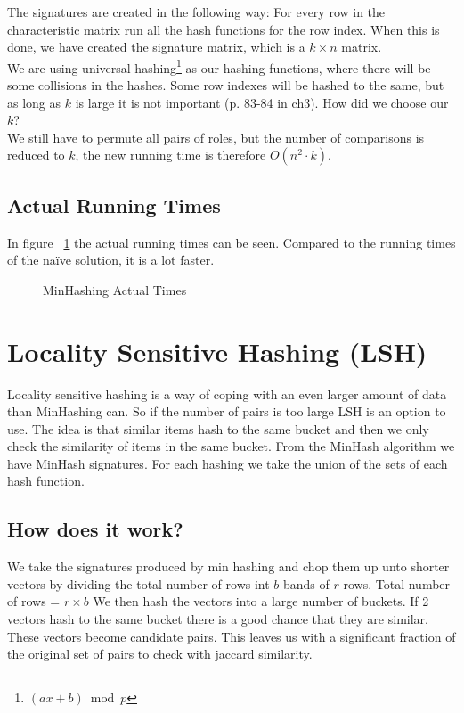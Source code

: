 \documentclass[a4paper,11pt]{article}
\begin{document}
The signatures are created in the following way: For every row in the characteristic matrix run all the hash functions for the row index. When this is done, we have created the signature matrix, which is a $k\times n$ matrix.\\

We are using universal hashing\footnote{$(ax + b) \bmod p$} as our hashing functions, where there will be some collisions in the hashes. Some row indexes will be hashed to the same, but as long as $k$ is large it is not important (p. 83-84 in ch3). How did we choose our $k$? \\

We still have to permute all pairs of roles, but the number of comparisons is reduced to $k$, the new running time is therefore $O(n^2 \cdot k)$.

\subsection{Actual Running Times}
In figure ~\ref{fig:minhashing_at} the actual running times can be seen. Compared to the running times of the naïve solution, it is a lot faster.


\begin{figure}
    \begin{center}
        
        \caption{MinHashing Actual Times}
        \label{fig:minhashing_at}
    \end{center}
\end{figure}


\section{Locality Sensitive Hashing (LSH)}
Locality sensitive hashing is a way of coping with an even larger amount of data than MinHashing can. So if the number of pairs is too large LSH is an option to use. The idea is that similar items hash to the same bucket and then we only check the similarity of items in the same bucket. From the MinHash algorithm we have MinHash signatures. For each hashing we take the union of the sets of each hash function.

\subsection{How does it work?}
We take the signatures produced by min hashing and chop them up unto shorter vectors by dividing the total number of rows int $b$ bands of $r$ rows. Total number of rows = $r\times b$ We then hash the vectors into a large number of buckets. If 2 vectors hash to the same bucket there is a good chance that they are similar. These vectors become candidate pairs. This leaves us with a significant fraction of the original set of pairs to check with jaccard similarity.\\
\end{document}
